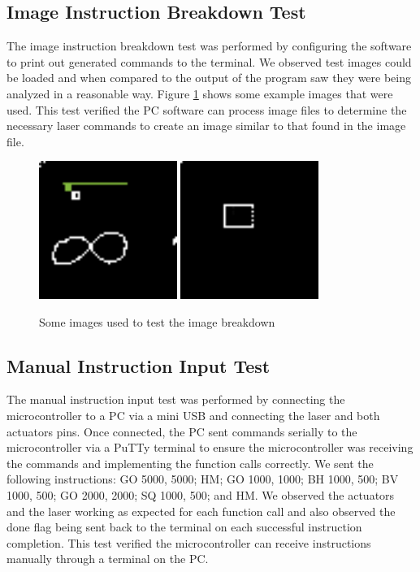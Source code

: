 \documentclass[11pt]{LaTeX-Classes/math-hw}
\begin{document}
\subsection{Image Instruction Breakdown Test}
The image instruction breakdown test was performed by configuring the software to print out
generated commands to the terminal. We observed test images could be loaded and when compared to the output of the program saw they were being
analyzed in a reasonable way. Figure \ref{fig:test-images} shows some example images that were used. This test verified the PC software can process image files to determine the necessary laser commands to create an image similar to that found in the image file.
\begin{figure}[H]
  \begin{center}
    \includegraphics[width=0.4\textwidth]{test3}
    \includegraphics[width=0.4\textwidth]{test4}
    \caption{Some images used to test the image breakdown}
    \label{fig:test-images}
  \end{center}
\end{figure}

\subsection{Manual Instruction Input Test}
The manual instruction input test was performed by connecting the microcontroller to a PC via a mini USB and connecting the laser and both actuators pins. Once connected, the PC sent commands serially to the microcontroller via a PuTTy terminal to ensure the microcontroller was receiving the commands and implementing the function calls correctly. We sent the following instructions: GO 5000, 5000; HM; GO 1000, 1000; BH 1000, 500; BV 1000, 500; GO 2000, 2000; SQ 1000, 500; and HM. We observed the actuators and the laser working as expected for each function call and also observed the done flag being sent back to the terminal on each successful instruction completion. This test verified the microcontroller can receive instructions manually through a terminal on the PC.
\end{document}
